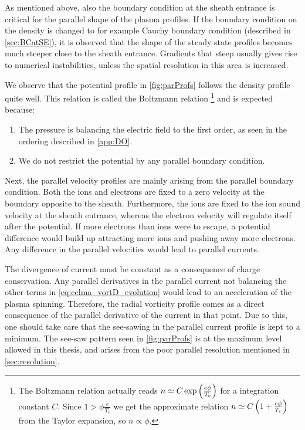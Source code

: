 As mentioned above, also the boundary condition at the sheath entrance is critical for the parallel shape of the plasma profiles.
If the boundary condition on the density is changed to for example Cauchy boundary condition (described in \cref{sec:BCatSE}), it is observed that the shape of the steady state profiles becomes much steeper close to the sheath entrance.
Gradients that steep usually gives rise to numerical instabilities, unless the spatial resolution in this area is increased.

We observe that the potential profile in \cref{fig:parProfs} follows the density profile quite well.
This relation is called the Boltzmann relation%
\footnote{The Boltzmann relation actually reads $n \simeq C\exp\left(\frac{e\phi}{T_e}\right)$ for a integration constant $C$.
    Since $1 > \phi\frac{e}{T_e}$ we get the approximate relation $n \simeq C\left(1+\frac{e\phi}{T_e}\right)$ from the Taylor expansion, so $n\propto\phi$.
}
%
and is expected because:
%
\begin{enumerate}[noitemsep]
        \item The pressure is balancing the electric field to the first order, as seen in the ordering described in \ref{app:DO}.
        \item We do not restrict the potential by any parallel boundary condition.
\end{enumerate}
%

Next, the parallel velocity profiles are mainly arising from the parallel boundary condition.
Both the ions and electrons are fixed to a zero velocity at the boundary opposite to the sheath.
Furthermore, the ions are fixed to the ion sound velocity at the sheath entrance, whereas the electron velocity will regulate itself after the potential.
If more electrons than ions were to escape, a potential difference would build up attracting more ions and pushing away more electrons.
%
%
Any difference in the parallel velocities would lead to parallel currents.

The divergence of current must be constant as a consequence of charge conservation.
Any parallel derivatives in the parallel current not balancing the other terms in \cref{eq:celma_vortD_evolution} would lead to an acceleration of the plasma spinning.
Therefore, the radial vorticity profile comes as a direct consequence of the parallel derivative of the current in that point.
Due to this, one should take care that the see-sawing in the parallel current profile is kept to a minimum.
The see-saw pattern seen in \cref{fig:parProfs} is at the maximum level allowed in this thesis, and arises from the poor parallel resolution mentioned in \ref{sec:resolution}.

